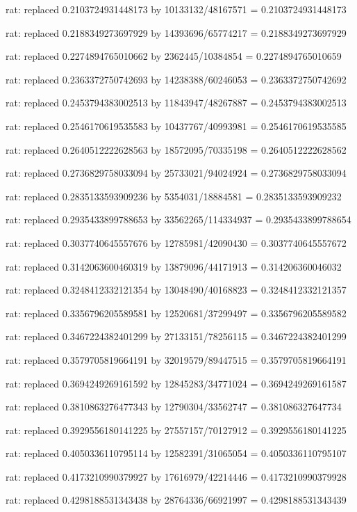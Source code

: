 \documentclass[a4paper,10pt]{article}
\begin{document}
\begin{eulernotebook}
\begin{eulercomment}
\begin{eulercomment}
\begin{eulercomment}
\begin{eulercomment}
\begin{eulercomment}
\begin{eulercomment}
\begin{eulercomment}
\begin{eulercomment}
\begin{eulercomment}
\begin{eulercomment}
\begin{eulercomment}
\begin{eulercomment}
\begin{eulercomment}
\begin{eulercomment}
\begin{eulercomment}
\begin{eulercomment}
\begin{euleroutput}
  rat: replaced 0.2103724931448173 by 10133132/48167571 = 0.2103724931448173
  
  rat: replaced 0.2188349273697929 by 14393696/65774217 = 0.2188349273697929
  
  rat: replaced 0.2274894765010662 by 2362445/10384854 = 0.2274894765010659
  
  rat: replaced 0.2363372750742693 by 14238388/60246053 = 0.2363372750742692
  
  rat: replaced 0.2453794383002513 by 11843947/48267887 = 0.2453794383002513
  
  rat: replaced 0.2546170619535583 by 10437767/40993981 = 0.2546170619535585
  
  rat: replaced 0.2640512222628563 by 18572095/70335198 = 0.2640512222628562
  
  rat: replaced 0.2736829758033094 by 25733021/94024924 = 0.2736829758033094
  
  rat: replaced 0.2835133593909236 by 5354031/18884581 = 0.2835133593909232
  
  rat: replaced 0.2935433899788653 by 33562265/114334937 = 0.2935433899788654
  
  rat: replaced 0.3037740645557676 by 12785981/42090430 = 0.3037740645557672
  
  rat: replaced 0.3142063600460319 by 13879096/44171913 = 0.314206360046032
  
  rat: replaced 0.3248412332121354 by 13048490/40168823 = 0.3248412332121357
  
  rat: replaced 0.3356796205589581 by 12520681/37299497 = 0.3356796205589582
  
  rat: replaced 0.3467224382401299 by 27133151/78256115 = 0.3467224382401299
  
  rat: replaced 0.3579705819664191 by 32019579/89447515 = 0.3579705819664191
  
  rat: replaced 0.3694249269161592 by 12845283/34771024 = 0.3694249269161587
  
  rat: replaced 0.3810863276477343 by 12790304/33562747 = 0.381086327647734
  
  rat: replaced 0.3929556180141225 by 27557157/70127912 = 0.3929556180141225
  
  rat: replaced 0.4050336110795114 by 12582391/31065054 = 0.4050336110795107
  
  rat: replaced 0.4173210990379927 by 17616979/42214446 = 0.4173210990379928
  
  rat: replaced 0.4298188531343438 by 28764336/66921997 = 0.4298188531343439
  

\end{euleroutput}
\end{eulercomment}
\end{eulercomment}
\end{eulercomment}
\end{eulercomment}
\end{eulercomment}
\end{eulercomment}
\end{eulercomment}
\end{eulercomment}
\end{eulercomment}
\end{eulercomment}
\end{eulercomment}
\end{eulercomment}
\end{eulercomment}
\end{eulercomment}
\end{eulercomment}
\end{eulercomment}
\end{eulernotebook}
\end{document}
